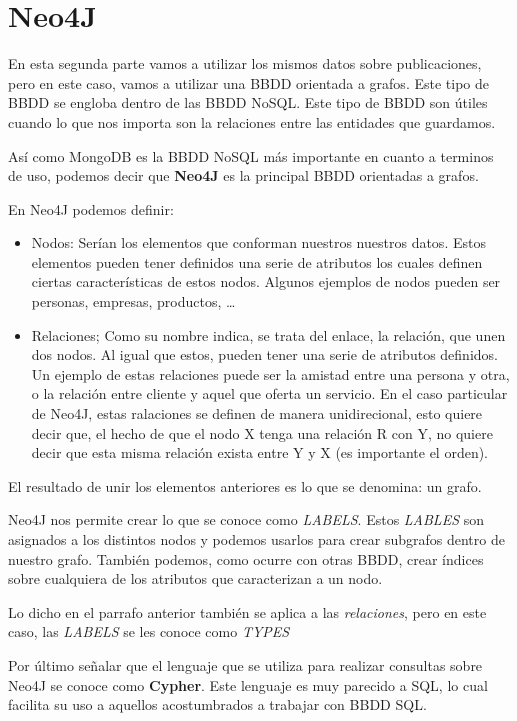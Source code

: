 \section{Neo4J}

En esta segunda parte vamos a utilizar los mismos datos sobre publicaciones, pero en este caso, vamos a utilizar una \gls{BBDD} orientada a grafos. Este tipo de \gls{BBDD} se engloba dentro de las \gls{BBDD} NoSQL. Este tipo de \gls{BBDD} son útiles cuando lo que nos importa son la relaciones entre las entidades que guardamos. 

Así como MongoDB es la \gls{BBDD} NoSQL más importante en cuanto a terminos de uso, podemos decir que \textbf{Neo4J} es la  principal \gls{BBDD} orientadas a grafos.

En Neo4J podemos definir:

\begin{itemize}
 \item Nodos: Serían los elementos que conforman nuestros nuestros datos. Estos elementos pueden tener definidos una serie de atributos los cuales definen ciertas características de estos nodos. Algunos ejemplos de nodos pueden ser personas, empresas, productos, \ldots
 \item Relaciones; Como su nombre indica, se trata del enlace, la relación, que unen dos nodos. Al igual que estos, pueden tener una serie de atributos definidos. Un ejemplo de estas relaciones puede ser la amistad entre una persona y otra, o la relación entre cliente y aquel que oferta un servicio. En el caso particular de Neo4J, estas ralaciones se definen de manera unidirecional, esto quiere decir que, el hecho de que el nodo X tenga una relación R con Y, no quiere decir que esta misma relación exista entre Y y X (es importante el orden). 
\end{itemize}

El resultado de unir los elementos anteriores es lo que se denomina: un grafo. 

Neo4J nos permite crear lo que se conoce como \textit{\:LABELS}. Estos \textit{\:LABLES} son asignados a los distintos nodos y podemos usarlos para crear subgrafos dentro de nuestro grafo. También podemos, como ocurre con otras \gls{BBDD}, crear índices  sobre cualquiera de los atributos que caracterizan a un nodo.

Lo dicho en el parrafo anterior también se aplica a las \textit{relaciones}, pero en este caso, las \textit{\:LABELS} se les conoce como \textit{\:TYPES}

Por último señalar que el lenguaje que se utiliza para realizar consultas sobre Neo4J se conoce como \textbf{Cypher}. Este lenguaje es muy parecido a \gls{SQL}, lo cual facilita su uso a aquellos acostumbrados a trabajar con \gls{BBDD} \gls{SQL}.




